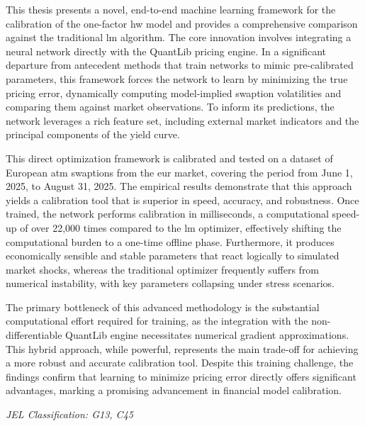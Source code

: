 This thesis presents a novel, end-to-end machine learning framework for the calibration of the one-factor \ac{hw} model and provides a comprehensive comparison against the traditional \ac{lm} algorithm. The core innovation involves integrating a neural network directly with the QuantLib pricing engine. In a significant departure from antecedent methods that train networks to mimic pre-calibrated parameters, this framework forces the network to learn by minimizing the true pricing error, dynamically computing model-implied swaption volatilities and comparing them against market observations. To inform its predictions, the network leverages a rich feature set, including external market indicators and the principal components of the yield curve.

This direct optimization framework is calibrated and tested on a dataset of European \ac{atm} swaptions from the \ac{eur} market, covering the period from June 1, 2025, to August 31, 2025. The empirical results demonstrate that this approach yields a calibration tool that is superior in speed, accuracy, and robustness. Once trained, the network performs calibration in milliseconds, a computational speed-up of over 22,000 times compared to the \ac{lm} optimizer, effectively shifting the computational burden to a one-time offline phase. Furthermore, it produces economically sensible and stable parameters that react logically to simulated market shocks, whereas the traditional optimizer frequently suffers from numerical instability, with key parameters collapsing under stress scenarios.

The primary bottleneck of this advanced methodology is the substantial computational effort required for training, as the integration with the non-differentiable QuantLib engine necessitates numerical gradient approximations. This hybrid approach, while powerful, represents the main trade-off for achieving a more robust and accurate calibration tool. Despite this training challenge, the findings confirm that learning to minimize pricing error directly offers significant advantages, marking a promising advancement in financial model calibration.

\textit{JEL Classification: G13, C45}